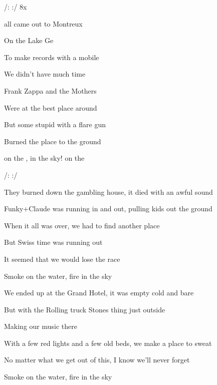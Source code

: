 

\zr
/:             :/ 8x
\kr

\zs
{} all came out to Montreux

On the Lake Ge 

To make records with a mobile

We didn't have much time

Frank Zappa and the Mothers

Were at the best place around

But some stupid with a flare gun

Burned the place to the ground
\ks

\zr
{} on the ,  in the sky!  on the 

/:             :/
\kr

\zs
They burned down the gambling house,
it died with an awful sound

Funky+Claude was running in and out,
pulling kids out the ground

When it all was over,
we had to find another place

But Swiss time was running out

It seemed that we would lose the race

Smoke on the water, fire in the sky
\ks

\zs
We ended up at the Grand Hotel,
it was empty cold and bare

But with the Rolling truck Stones thing just outside

Making our music there

With a few red lights and a few old beds,
we make a place to sweat

No matter what we get out of this,
I know we'll never forget

Smoke on the water, fire in the sky
\ks

